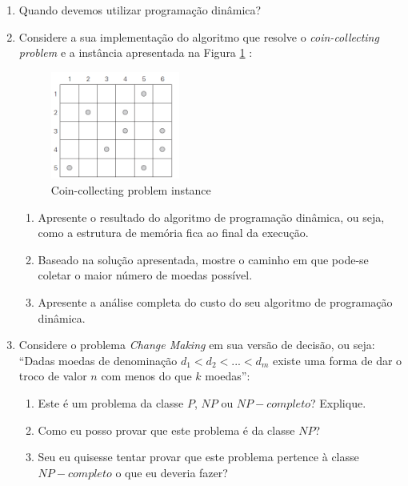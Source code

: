\documentclass{article}
\begin{document}
\begin{enumerate}

    \item Quando devemos utilizar programação dinâmica?
   
    \item Considere a sua implementação do algoritmo que resolve o \textit{coin-collecting problem} e a instância apresentada na Figura \ref{fig:coin_col} :
    
    \begin{figure}[!ht]
        \centering
        \includegraphics[width=0.4\textwidth]{tabCoinColl.png}
        \caption{Coin-collecting problem instance}
        \label{fig:coin_col}
    \end{figure}

    \begin{enumerate}
        \item Apresente o resultado do algoritmo de programação dinâmica, ou seja, como a estrutura de memória fica ao final da execução.
        \item Baseado na solução apresentada, mostre o caminho em que pode-se coletar o maior número de moedas possível. 
        \item Apresente a análise completa do custo do seu algoritmo de programação dinâmica.
    \end{enumerate}

    \item Considere o problema \textit{Change Making} em sua versão de decisão, ou seja: ``Dadas moedas de denominação $d_1 < d_2 < ... <d_m$ existe uma forma de dar o troco de valor $n$ com menos do que $k$ moedas'':
    \begin{enumerate}
        \item Este é um problema da classe $P$, $NP$ ou $NP-completo$? Explique.
        \item Como eu posso provar que este problema é da classe $NP$?
        \item Seu eu quisesse tentar provar que este problema pertence à classe $NP-completo$ o que eu deveria fazer?
    \end{enumerate}
   
\end{enumerate}



%
%
\end{document}
